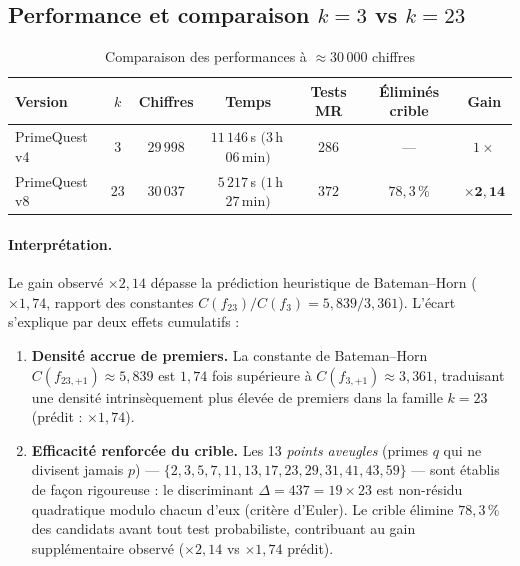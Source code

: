 \subsection{Performance et comparaison $k=3$ vs $k=23$}
\label{subsec:comparaison_k3_k23}

\begin{table}[h]
\centering
\caption{Comparaison des performances à $\approx 30\,000$ chiffres}
\label{tab:comparaison_k3_k23}
\begin{tabular}{lcccccc}
\hline
Version & $k$ & Chiffres & Temps & Tests MR & Éliminés crible & Gain \\
\hline
PrimeQuest v4 & $3$  & $29\,998$ & $11\,146$\,s $(3$\,h\,$06$\,min$)$ & $286$ & — & $1\times$ \\
PrimeQuest v8 & $23$ & $30\,037$ & $\phantom{1}5\,217$\,s $(1$\,h\,$27$\,min$)$ & $372$ & $78{,}3\,\%$ & $\mathbf{\times 2{,}14}$ \\
\hline
\end{tabular}
\end{table}

\paragraph{Interprétation.}
Le gain observé $\times 2{,}14$ dépasse la prédiction heuristique de Bateman--Horn
($\times 1{,}74$, rapport des constantes $C(f_{23})/C(f_3) = 5{,}839/3{,}361$).
L'écart s'explique par deux effets cumulatifs :

\begin{enumerate}
  \item \textbf{Densité accrue de premiers.}
  La constante de Bateman--Horn $C(f_{23,+1}) \approx 5{,}839$ est $1{,}74$ fois supérieure
  à $C(f_{3,+1}) \approx 3{,}361$, traduisant une densité intrinsèquement plus élevée
  de premiers dans la famille $k=23$ (prédit : $\times 1{,}74$).

  \item \textbf{Efficacité renforcée du crible.}
  Les 13 \emph{points aveugles} (primes $q$ qui ne divisent jamais $p$)
  — $\{2,3,5,7,11,13,17,23,29,31,41,43,59\}$ —
  sont établis de façon rigoureuse : le discriminant $\Delta = 437 = 19\times23$
  est non-résidu quadratique modulo chacun d'eux (critère d'Euler).
  Le crible élimine $78{,}3\,\%$ des candidats avant tout test probabiliste,
  contribuant au gain supplémentaire observé ($\times 2{,}14$ vs $\times 1{,}74$ prédit).
\end{enumerate}

